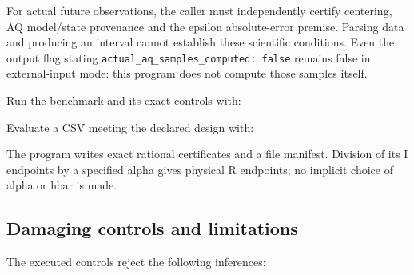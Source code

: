 For actual future observations, the caller must independently certify centering, AQ model/state provenance and the epsilon absolute-error premise. Parsing data and producing an interval cannot establish these scientific conditions. Even the output flag stating \texttt{actual\_aq\_samples\_computed:\ false} remains false in external-input mode: this program does not compute those samples itself.

Run the benchmark and its exact controls with:

{\small{}}

Evaluate a CSV meeting the declared design with:

{\small{}}

The program writes exact rational certificates and a file manifest. Division of its I endpoints by a specified alpha gives physical R endpoints; no implicit choice of alpha or hbar is made.

\hypertarget{r30-at3-reverse-damaging-controls-and-limitations}{%
\subsection{Damaging controls and limitations}\label{r30:at3:reverse:r30-at3-reverse-damaging-controls-and-limitations}}

The executed controls reject the following inferences:

